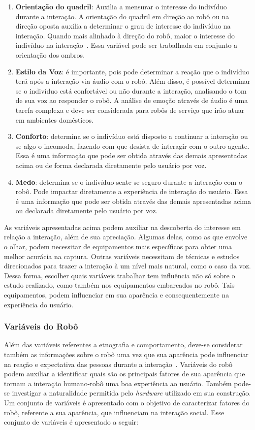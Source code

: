 \begin{enumerate}
    \item \textbf{Orientação do quadril}: Auxilia a mensurar o interesse do indivíduo durante a interação. A orientação do quadril em direção ao robô ou na direção oposta auxilia a determinar o grau de interesse do indivíduo na interação. Quando mais alinhado à direção do robô, maior o interesse do indivíduo na interação~\cite{lambert:2008}. Essa variável pode ser trabalhada em conjunto a orientação dos ombros.
    \item \textbf{Estilo da Voz}: é importante, pois pode determinar a reação que o indivíduo terá após a interação via áudio com o robô. Além disso, é possível determinar se o indivíduo está confortável ou não durante a interação, analisando o tom de sua voz ao responder o robô. A análise de emoção através de áudio é uma tarefa complexa e deve ser considerada para robôs de serviço que irão atuar em ambientes domésticos.
    \item \textbf{Conforto}: determina se o indivíduo está disposto a continuar a interação ou se algo o incomoda, fazendo com que desista de interagir com o outro agente. Essa é uma informação que pode ser obtida através das demais apresentadas acima ou de forma declarada diretamente pelo usuário por voz.
    \item \textbf{Medo}: determina se o indivíduo sente-se seguro durante a interação com o robô. Pode impactar diretamente a experiência de interação do usuário. Essa é uma informação que pode ser obtida através das demais apresentadas acima ou declarada diretamente pelo usuário por voz.
\end{enumerate}

As variáveis apresentadas acima podem auxiliar na descoberta do interesse em relação a interação, além de sua apreciação. Algumas delas, como as que envolve o olhar, podem necessitar de equipamentos mais específicos para obter uma melhor acurácia na captura. Outras variáveis necessitam de técnicas e estudos direcionados para trazer a interação à um nível mais natural, como o caso da voz. Dessa forma, escolher quais variáveis trabalhar tem influência não só sobre o estudo realizado, como também nos equipamentos embarcados no robô. Tais equipamentos, podem influenciar em sua aparência e consequentemente na experiência do usuário.

\subsubsection{Variáveis do Robô}
\label{sec:variaveisrobo}
Além das variáveis referentes a etnografia e comportamento, deve-se considerar também as informações sobre o robô uma vez que sua aparência pode influenciar na reação e expectativa das pessoas durante a interação~\cite{hegel:2009}. Variáveis do robô podem auxiliar a identificar quais são os principais fatores de sua aparência que tornam a interação humano-robô uma boa experiência ao usuário. Também pode-se investigar a naturalidade permitida pelo \textit{hardware} utilizado em sua construção. Um conjunto de variáveis é apresentado com o objetivo de caracterizar fatores do robô, referente a sua aparência, que influenciam na interação social. Esse conjunto de variáveis é apresentado a seguir:

